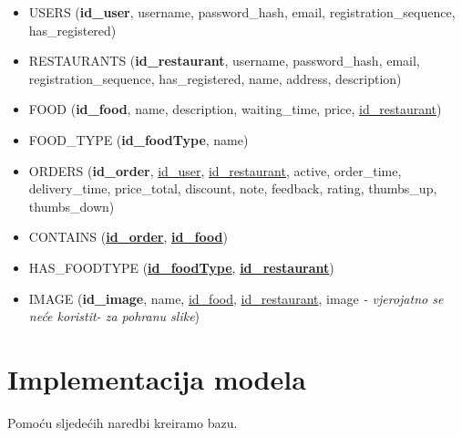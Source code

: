 \documentclass[12pt]{scrartcl}
\begin{document}
\begin{itemize}
    \item[] \textsf{USERS (\textbf{id\_user}, username, password\_hash, email, registration\_sequence, \\has\_registered)}
    \item[] \textsf{RESTAURANTS (\textbf{id\_restaurant}, username, password\_hash, email, \\registration\_sequence, has\_registered, name, address, description)}
    \item[] \textsf{FOOD (\textbf{id\_food}, name, description, waiting\_time, price, \underline{id\_restaurant})}
    \item[] \textsf{FOOD\_TYPE (\textbf{id\_foodType}, name)}
    \item[] \textsf{ORDERS (\textbf{id\_order}, \underline{id\_user}, \underline{id\_restaurant}, active, order\_time, delivery\_time, price\_total, discount, note, feedback, rating, thumbs\_up, thumbs\_down)}
    \item[] \textsf{CONTAINS (\textbf{\underline{id\_order}}, \textbf{\underline{id\_food}})}
    \item[] \textsf{HAS\_FOODTYPE (\textbf{\underline{id\_foodType}}, \textbf{\underline{id\_restaurant}})}
    \item[] \textsf{IMAGE (\textbf{id\_image}, name, \underline{id\_food}, \underline{id\_restaurant}, image \emph{- vjerojatno se neće koristit- za pohranu slike})}

\end{itemize}

\pagebreak[3]

\section{Implementacija modela}

Pomoću sljedećih naredbi kreiramo bazu.
\end{document}
